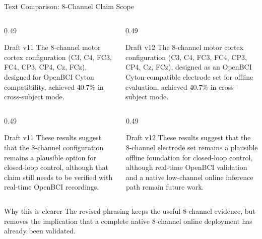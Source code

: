 \documentclass[UTF8,aspectratio=169,11pt]{ctexbeamer}
\begin{document}
\begin{frame}[t]{Text Comparison: 8-Channel Claim Scope}
\scriptsize

    \begin{columns}[T,onlytextwidth]
        \begin{column}{0.49\textwidth}
            \begin{alertblock}{Draft v11}
                The 8-channel motor cortex configuration (C3, C4, FC3, FC4, CP3, CP4, Cz, FCz), designed for OpenBCI Cyton compatibility, achieved 40.7\% in cross-subject mode.
            \end{alertblock}
        \end{column}
        \begin{column}{0.49\textwidth}
            \begin{block}{Draft v12}
                The 8-channel motor cortex configuration (C3, C4, FC3, FC4, CP3, CP4, Cz, FCz), designed as an OpenBCI Cyton-compatible electrode set for offline evaluation, achieved 40.7\% in cross-subject mode.
            \end{block}
        \end{column}
    \end{columns}

    \vspace{0.5em}

    \begin{columns}[T,onlytextwidth]
        \begin{column}{0.49\textwidth}
            \begin{alertblock}{Draft v11}
                These results suggest that the 8-channel configuration remains a plausible option for closed-loop control, although that claim still needs to be verified with real-time OpenBCI recordings.
            \end{alertblock}
        \end{column}
        \begin{column}{0.49\textwidth}
            \begin{block}{Draft v12}
                These results suggest that the 8-channel electrode set remains a plausible offline foundation for closed-loop control, although real-time OpenBCI validation and a native low-channel online inference path remain future work.
            \end{block}
        \end{column}
    \end{columns}

    \vfill

    \begin{block}{Why this is clearer}
        The revised phrasing keeps the useful 8-channel evidence, but removes the implication that a complete native 8-channel online deployment has already been validated.
    \end{block}

\end{frame}
\end{document}
